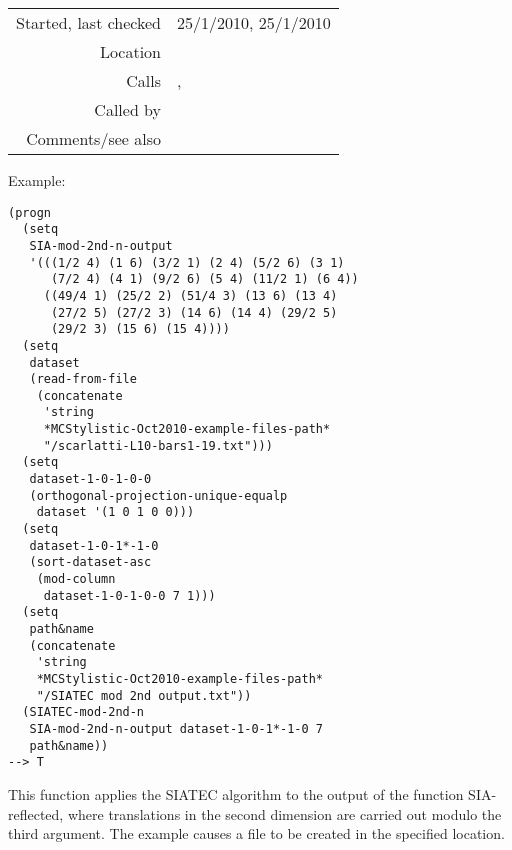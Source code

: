 \vspace{0.3cm}
\begin{tabular}{r|p{8cm}}
Started, last checked & 25/1/2010, 25/1/2010 \\
Location & \nameref{sec:further-structural-induction-algorithms} \\
Calls & \nameref{fun:translators-of-pattern-in-dataset-mod-2nd-n}, \nameref{fun:write-to-file} \\
Called by & \nameref{fun:COSIATEC-mod-2nd-n} \\
Comments/see also & \nameref{fun:SIATEC}
\end{tabular}

\vspace{0.5cm}
\noindent Example:
\begin{verbatim}
(progn
  (setq
   SIA-mod-2nd-n-output
   '(((1/2 4) (1 6) (3/2 1) (2 4) (5/2 6) (3 1)
      (7/2 4) (4 1) (9/2 6) (5 4) (11/2 1) (6 4))
     ((49/4 1) (25/2 2) (51/4 3) (13 6) (13 4)
      (27/2 5) (27/2 3) (14 6) (14 4) (29/2 5)
      (29/2 3) (15 6) (15 4))))
  (setq
   dataset
   (read-from-file
    (concatenate
     'string
     *MCStylistic-Oct2010-example-files-path*
     "/scarlatti-L10-bars1-19.txt")))
  (setq
   dataset-1-0-1-0-0
   (orthogonal-projection-unique-equalp
    dataset '(1 0 1 0 0)))
  (setq
   dataset-1-0-1*-1-0
   (sort-dataset-asc
    (mod-column
     dataset-1-0-1-0-0 7 1)))
  (setq
   path&name
   (concatenate
    'string
    *MCStylistic-Oct2010-example-files-path*
    "/SIATEC mod 2nd output.txt"))
  (SIATEC-mod-2nd-n
   SIA-mod-2nd-n-output dataset-1-0-1*-1-0 7
   path&name))
--> T
\end{verbatim}

\noindent This function applies the SIATEC algorithm
to the output of the function SIA-reflected, where
translations in the second dimension are carried out
modulo the third argument. The example causes a file
to be created in the specified location.


























